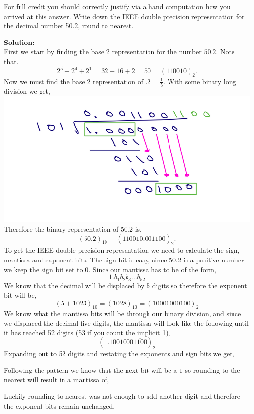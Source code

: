 \documentclass[12pt]{article}
\makeatletter
\theoremstyle{homework}
\newenvironment{exercise}[1]
{\def\@currentlabel{#1}\exercisecore}
{\endexercisecore}
\newcommand{\localhead}[1]{\par\smallskip\noindent\textbf{#1}\nobreak\\}%
\newcommand\solution{\localhead{Solution:}}
\makeatother
\begin{document}
\vspace{.5in}


\begin{exercise}{Problem 5.2} For full credit you should correctly justify via a hand computation how you arrived at this answer. Write down the IEEE double precision representation
  for the decimal number 50.2, round to nearest. \\
  
  \solution First we start by finding the base 2 representation for the number $50.2$. Note that,
  \begin{equation*}
    2^5+2^4+2^1 = 32+16+2 = 50 = (110010)_2.
  \end{equation*}
Now we must find the base 2 representation of $.2 =\frac{1}{5}$. With some binary long division we get,\\

\includegraphics[width = \textwidth]{binarydivision.png}
Therefore the binary representation of $50.2$ is,
\begin{equation*}
  (50.2)_{10} = (110010.00\overline{1100})_2.
\end{equation*}
To get the IEEE double precision representation we need to calculate the sign, mantissa and exponent bits.
The sign bit is easy, since $50.2$ is a positive number we keep the sign bit set to $0$. Since our mantissa has to be of the form,
\begin{equation*}
  1.b_1b_2b_3...b_{52}
\end{equation*}
We know that the decimal will be displaced by 5 digits so therefore the exponent bit will be, 
\begin{equation*}
  (5+1023)_{10} = (1028)_{10} = (10000000100)_2
\end{equation*}
We know what the mantissa bits will be through our binary division, and since we displaced the decimal five digits,
the mantissa will look like the following until it has reached 52 digits (53 if you count the implicit 1),
\begin{equation*}
  (1.1001000\overline{1100})_2
\end{equation*} 
Expanding out to 52 digits and restating the exponents and sign bits we get,

Following the pattern we know that the next bit will be a $1$ so rounding to the nearest will result in a mantissa of,

Luckily rounding to nearest was not enough to add another digit and therefore the exponent bits remain unchanged. 

\end{exercise}
\end{document}

